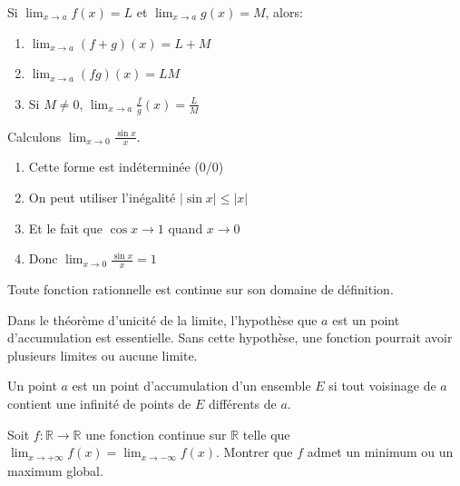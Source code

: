 \documentclass[11pt,%
	fleqn,%
	a4paper,%
	twoside%
]{backagBook}
\begin{document}
\begin{proposition}
Si $\lim_{x \to a} f(x) = L$ et $\lim_{x \to a} g(x) = M$, alors:
\begin{enumerate}
    \item $\lim_{x \to a} (f+g)(x) = L + M$
    \item $\lim_{x \to a} (fg)(x) = LM$
    \item Si $M \neq 0$, $\lim_{x \to a} \frac{f}{g}(x) = \frac{L}{M}$
\end{enumerate}
\end{proposition}

\begin{example}
Calculons $\lim_{x \to 0} \frac{\sin x}{x}$.
\begin{enumerate}
    \item Cette forme est indéterminée (0/0)
    \item On peut utiliser l'inégalité $|\sin x| \leq |x|$
    \item Et le fait que $\cos x \to 1$ quand $x \to 0$
    \item Donc $\lim_{x \to 0} \frac{\sin x}{x} = 1$
\end{enumerate}
\end{example}

\begin{corollary}
Toute fonction rationnelle est continue sur son domaine de définition.
\end{corollary}

\begin{remark}
Dans le théorème d'unicité de la limite, l'hypothèse que $a$ est un point d'accumulation est essentielle. Sans cette hypothèse, une fonction pourrait avoir plusieurs limites ou aucune limite.
\end{remark}

\begin{vocabulary}
Un point $a$ est un point d'accumulation d'un ensemble $E$ si tout voisinage de $a$ contient une infinité de points de $E$ différents de $a$.
\end{vocabulary}

\begin{problem}
Soit $f: \mathbb{R} \to \mathbb{R}$ une fonction continue sur $\mathbb{R}$ telle que $\lim_{x \to +\infty} f(x) = \lim_{x \to -\infty} f(x)$. Montrer que $f$ admet un minimum ou un maximum global.
\end{problem}
\end{document}

